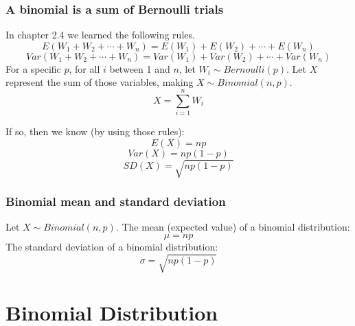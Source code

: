 \begin{frame}
\frametitle{A binomial is a sum of Bernoulli trials}
In chapter 2.4 we learned the following rules.
$$E(W_1 + W_2 + \cdots + W_n) = E(W_1) + E(W_2) + \cdots + E(W_n) $$
$$Var(W_1 + W_2 + \cdots + W_n) = Var(W_1) + Var(W_2) + \cdots + Var(W_n) $$
\pause
For a specific $p$, for all $i$ between 1 and $n$, let $W_i\sim Bernoulli(p)$. Let $X$ represent the sum of those variables, making $X\sim Binomial(n,p)$.
$$X = \sum_{i=1}^n W_i $$

If so, then we know (by using those rules):
$$E(X) = np $$
$$Var(X) = np(1-p) $$
$$SD(X) = \sqrt{np(1-p)} $$
\end{frame}



\begin{frame}
\frametitle{Binomial mean and standard deviation}
Let $X\sim Binomial(n,p)$.
The mean (expected value) of a binomial distribution:
{\LARGE $$\mu = np $$}
The standard deviation of a binomial distribution:
{\LARGE $$ \sigma = \sqrt{np(1-p)} $$}
\end{frame}


\section{Binomial Distribution}

\begin{frame}

\end{frame}




